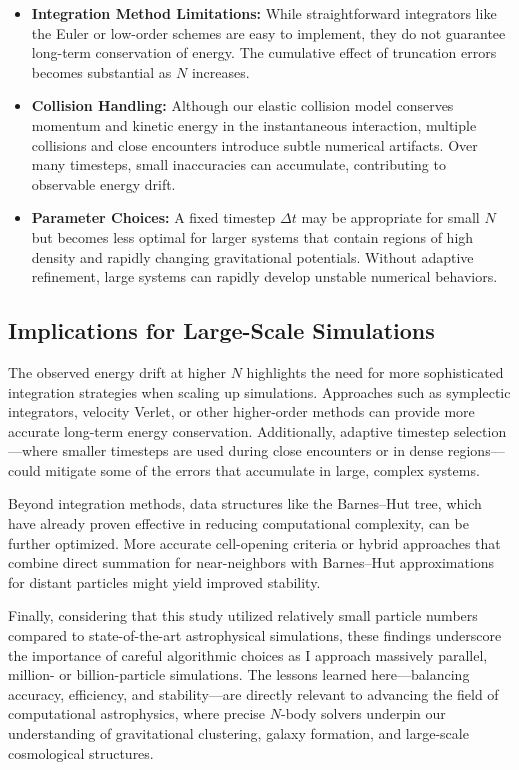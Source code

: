 \documentclass[a4paper, 12pt, oneside, onecolumn]{article}
\begin{document}
\begin{multicols}{2}
\begin{itemize}
    \item \textbf{Integration Method Limitations:} While straightforward integrators like the Euler or low-order schemes are easy to implement, they do not guarantee long-term conservation of energy. The cumulative effect of truncation errors becomes substantial as $N$ increases.
    \item \textbf{Collision Handling:} Although our elastic collision model conserves momentum and kinetic energy in the instantaneous interaction, multiple collisions and close encounters introduce subtle numerical artifacts. Over many timesteps, small inaccuracies can accumulate, contributing to observable energy drift.
    \item \textbf{Parameter Choices:} A fixed timestep $\Delta t$ may be appropriate for small $N$ but becomes less optimal for larger systems that contain regions of high density and rapidly changing gravitational potentials. Without adaptive refinement, large systems can rapidly develop unstable numerical behaviors.
\end{itemize}

\subsection*{Implications for Large-Scale Simulations}

The observed energy drift at higher $N$ highlights the need for more sophisticated integration strategies when scaling up simulations. Approaches such as symplectic integrators, velocity Verlet, or other higher-order methods can provide more accurate long-term energy conservation. Additionally, adaptive timestep selection—where smaller timesteps are used during close encounters or in dense regions—could mitigate some of the errors that accumulate in large, complex systems.

Beyond integration methods, data structures like the Barnes–Hut tree, which have already proven effective in reducing computational complexity, can be further optimized. More accurate cell-opening criteria or hybrid approaches that combine direct summation for near-neighbors with Barnes–Hut approximations for distant particles might yield improved stability.

Finally, considering that this study utilized relatively small particle numbers compared to state-of-the-art astrophysical simulations, these findings underscore the importance of careful algorithmic choices as I approach massively parallel, million- or billion-particle simulations. The lessons learned here—balancing accuracy, efficiency, and stability—are directly relevant to advancing the field of computational astrophysics, where precise $N$-body solvers underpin our understanding of gravitational clustering, galaxy formation, and large-scale cosmological structures.


\end{multicols}
\end{document}
